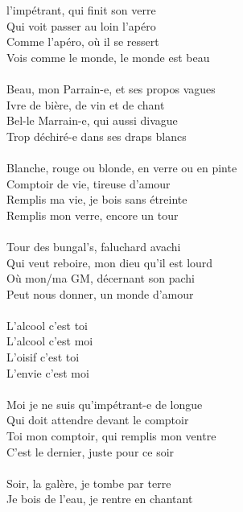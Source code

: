 
 l'impétrant, qui finit son verre
\\Qui voit passer au loin l'apéro
\\Comme l'apéro, où il se ressert
\\Vois comme le monde, le monde est beau
\\\\Beau, mon Parrain-e, et ses propos vagues
\\Ivre de bière, de vin et de chant
\\Bel-le Marrain-e, qui aussi divague
\\Trop déchiré-e dans ses draps blancs
\\\\Blanche, rouge ou blonde, en verre ou en pinte
\\Comptoir de vie, tireuse d'amour
\\Remplis ma vie, je bois sans étreinte
\\Remplis mon verre, encore un tour
\\\\Tour des bungal's, faluchard avachi
\\Qui veut reboire, mon dieu qu'il est lourd
\\Où mon/ma GM, décernant son pachi
\\Peut nous donner, un monde d'amour
\\\\L'alcool c'est toi
\\L'alcool c'est moi
\\L'oisif c'est toi
\\L'envie c'est moi
\\\\Moi je ne suis qu'impétrant-e de longue
\\Qui doit attendre devant le comptoir
\\Toi mon comptoir, qui remplis mon ventre
\\C'est le dernier, juste pour ce soir
\\\\Soir, la galère, je tombe par terre
\\Je bois de l'eau, je rentre en chantant
